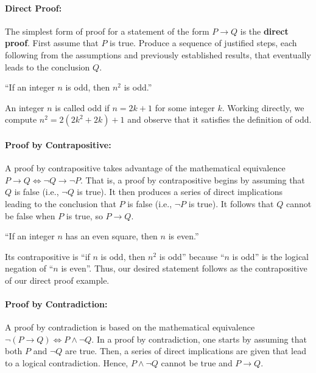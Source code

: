 \paragraph{Direct Proof:}

The simplest form of proof for a statement of the form $P \rightarrow Q$ is the \textbf{direct proof}.
First assume that $P$ is true.
Produce a sequence of justified steps, each following from the assumptions and previously established results, that eventually leads to the conclusion $Q$.

\begin{example}
``If an integer $n$ is odd, then $n^2$ is odd.''

 An integer $n$ is called odd if $n=2k+1$ for some integer $k$.
 Working directly, we compute $n^2 = 2 (2k^2+2k)+1$ and observe that it satisfies the definition of odd.
\end{example}

\paragraph{Proof by Contrapositive:}
A proof by contrapositive takes advantage of the mathematical equivalence $P \rightarrow Q \Leftrightarrow \neg Q \rightarrow \neg P$.
That is, a proof by contrapositive begins by assuming that $Q$ is false (i.e., $\neg Q$ is true).
It then produces a series of direct implications leading to the conclusion that $P$ is false (i.e., $\neg P$ is true).
It follows that $Q$ cannot be false when $P$ is true, so $P \rightarrow Q$.

\begin{example} \label{example:even_square}
``If an integer $n$ has an even square, then $n$ is even.''

Its contrapositive is ``if $n$ is odd, then $n^2$ is odd'' because ``$n$ is odd'' is the logical negation of ``$n$ is even''.
Thus, our desired statement follows as the contrapositive of our direct proof example.
\end{example}

\paragraph{Proof by Contradiction:}
A proof by contradiction is based on the mathematical equivalence $\neg (P \rightarrow Q) \Leftrightarrow P \wedge \neg Q$.
In a proof by contradiction, one starts by assuming that both $P$ and $\neg Q$ are true.
Then, a series of direct implications are given that lead to a logical contradiction.
Hence, $P \wedge \neg Q$ cannot be true and $P \rightarrow Q$.

